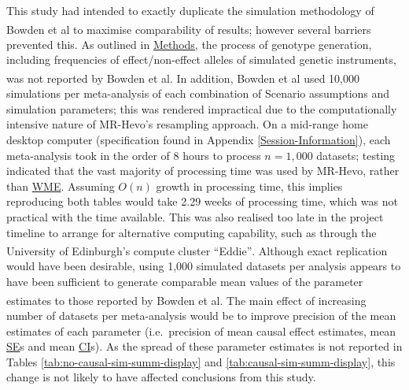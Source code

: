 \documentclass[
]{article}
\begin{document}
This study had intended to exactly duplicate the simulation methodology of Bowden et al\textsuperscript{} to maximise comparability of results; however several barriers prevented this. As outlined in \hyperref[methods]{Methods}, the process of genotype generation, including frequencies of effect/non-effect alleles of simulated genetic instruments, was not reported by Bowden et al\textsuperscript{}. In addition, Bowden et al used 10,000 simulations per meta-analysis of each combination of Scenario assumptions and simulation parameters; this was rendered impractical due to the computationally intensive nature of MR-Hevo's resampling approach. On a mid-range home desktop computer (specification found in Appendix \ref{Session-Information}), each meta-analysis took in the order of 8 hours to process \(n = 1,000\) datasets; testing indicated that the vast majority of processing time was used by MR-Hevo, rather than \hyperref[acronyms_WME]{WME}. Assuming \(O(n)\) growth in processing time, this implies reproducing both tables would take 2.29 weeks of processing time, which was not practical with the time available. This was also realised too late in the project timeline to arrange for alternative computing capability, such as through the University of Edinburgh's compute cluster ``Eddie''\textsuperscript{}. Although exact replication would have been desirable, using 1,000 simulated datasets per analysis appears to have been sufficient to generate comparable mean values of the parameter estimates to those reported by Bowden et al\textsuperscript{}. The main effect of increasing number of datasets per meta-analysis would be to improve precision of the mean estimates of each parameter (i.e.~precision of mean causal effect estimates, mean \hyperref[acronyms_SE]{SE}s and mean \hyperref[acronyms_CI]{CI}s). As the spread of these parameter estimates is not reported in Tables \ref{tab:no-causal-sim-summ-display} and \ref{tab:causal-sim-summ-display}, this change is not likely to have affected conclusions from this study.
\end{document}
